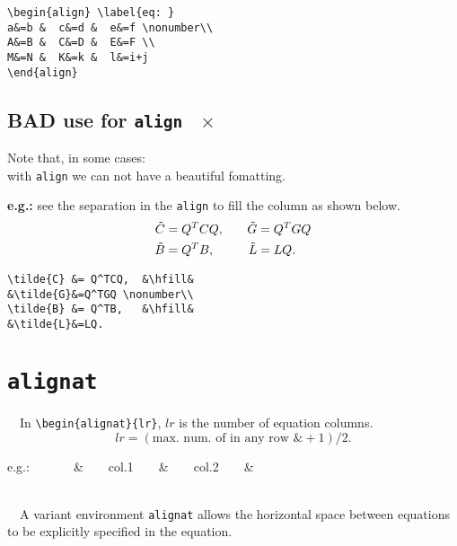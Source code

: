 \documentclass[journal]{IEEEtran}
\begin{document}
\begin{verbatim}
\begin{align} \label{eq: }
a&=b &  c&=d &  e&=f \nonumber\\
A&=B &  C&=D &  E&=F \\
M&=N &  K&=k &  l&=i+j
\end{align}
\end{verbatim}

\subsection{BAD use for \texttt{align}~{{\color{red} \Large $\mathbf{\times}$}}}
\mbox{}\par \noindent Note that, in some cases:\\
{\color{red} with \verb!align! we can not have a beautiful fomatting}.\par
\textbf{e.g.:} see the separation in the \verb!align! to fill the column as shown below.\\

\begin{align}
\tilde{C} &= Q^TCQ,  &\hfill&  &\tilde{G}&=Q^TGQ \nonumber\\
\tilde{B} &= Q^TB,   &\hfill&  &\tilde{L}&=LQ.
\end{align}

\begin{verbatim}
\tilde{C} &= Q^TCQ,  &\hfill&  
&\tilde{G}&=Q^TGQ \nonumber\\
\tilde{B} &= Q^TB,   &\hfill&  
&\tilde{L}&=LQ.
\end{verbatim}

\noindent \dotfill
\section{\texttt{alignat}}
\textbullet~~In \verb!\begin{alignat}{lr}!, $lr$ is the number of equation columns. 
\[lr=(\text{max. num. of in any row } \& + 1)/2.\]
\centerline{e.g.:~~~~~~~\&~~~~col.1~~~~\&~~~~col.2~~~~\& }\\

\textbullet~~A variant environment \verb!alignat! allows the horizontal space between equations
to be explicitly specified in the equation.\\[8pt]
\end{document}
